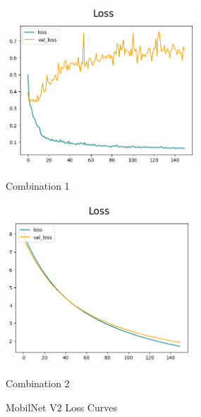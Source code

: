 \begin{figure}[H]
    \centering
    \begin{minipage}[b]{0.49\textwidth}
        \centering
        \includegraphics[width=\textwidth, height=6cm]{Figures/balanced_data/less_data/withoutbn/mn2/loss.png}
        \captionsetup{labelformat=empty}
        \caption{Combination 1}
        \label{fig:u_wo_r_l}
    \end{minipage}
    \hfill
    \begin{minipage}[b]{0.49\textwidth}
        \centering
        \includegraphics[width=\textwidth, height=6cm]{Figures/balanced_data/less_data/withbn/mn2/loss.png}
        \captionsetup{labelformat=empty}
        \caption{Combination 2}
        \label{fig:u_w_r_l}
    \end{minipage}
    \captionsetup{labelformat=default}
    \caption{MobilNet V2 Loss Curves}
\end{figure}

